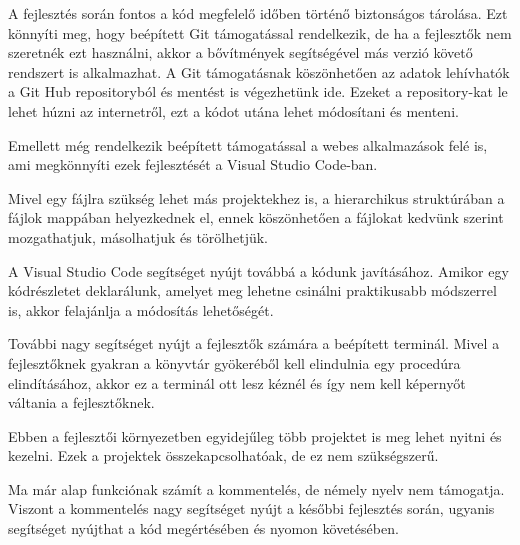 A fejlesztés során fontos a kód megfelelő időben történő biztonságos tárolása. Ezt könnyíti meg, hogy beépített Git támogatással rendelkezik, de ha a fejlesztők nem szeretnék ezt használni, akkor a bővítmények segítségével más verzió követő rendszert is alkalmazhat. A Git támogatásnak köszönhetően az adatok lehívhatók a Git Hub repositoryból és mentést is végezhetünk ide. Ezeket a repository-kat le lehet húzni az internetről, ezt a kódot utána lehet módosítani és menteni.

Emellett még rendelkezik beépített támogatással a webes alkalmazások felé is, ami megkönnyíti ezek fejlesztését a Visual Studio Code-ban.

Mivel egy fájlra szükség lehet más projektekhez is, a hierarchikus struktúrában a fájlok mappában helyezkednek el, ennek köszönhetően a fájlokat kedvünk szerint mozgathatjuk, másolhatjuk és törölhetjük.

A Visual Studio Code segítséget nyújt továbbá a kódunk javításához. Amikor egy kódrészletet deklarálunk, amelyet meg lehetne csinálni praktikusabb módszerrel is, akkor felajánlja a módosítás lehetőségét.   

További nagy segítséget nyújt a fejlesztők számára a beépített terminál. Mivel a fejlesztőknek gyakran a könyvtár gyökeréből kell elindulnia egy procedúra elindításához, akkor ez a terminál ott lesz kéznél és így nem kell képernyőt váltania a fejlesztőknek.

Ebben a fejlesztői környezetben egyidejűleg több projektet is meg lehet nyitni és kezelni. Ezek a projektek összekapcsolhatóak, de ez nem szükségszerű.

Ma már alap funkciónak számít a kommentelés, de némely nyelv nem támogatja. Viszont a kommentelés nagy segítséget nyújt a későbbi fejlesztés során, ugyanis segítséget nyújthat a kód megértésében és nyomon követésében. 
